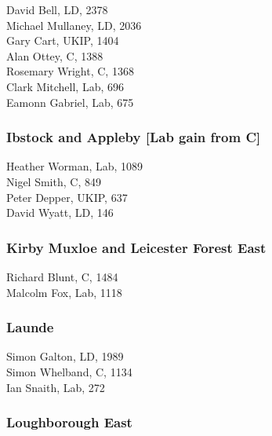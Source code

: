 \documentclass[a4paper,openany,10pt]{book}
\begin{document}


David Bell, LD, 2378\\
Michael Mullaney, LD, 2036\\
Gary Cart, UKIP, 1404\\
Alan Ottey, C, 1388\\
Rosemary Wright, C, 1368\\
Clark Mitchell, Lab, 696\\
Eamonn Gabriel, Lab, 675\\


\subsubsection*{Ibstock and Appleby \hspace*{\fill}\nolinebreak[1]%
\enspace\hspace*{\fill}
[Lab gain from C]}



Heather Worman, Lab, 1089\\
Nigel Smith, C, 849\\
Peter Depper, UKIP, 637\\
David Wyatt, LD, 146\\


\subsubsection*{Kirby Muxloe and Leicester Forest East}



Richard Blunt, C, 1484\\
Malcolm Fox, Lab, 1118\\


\subsubsection*{Launde}



Simon Galton, LD, 1989\\
Simon Whelband, C, 1134\\
Ian Snaith, Lab, 272\\


\subsubsection*{Loughborough East}
\end{document}
